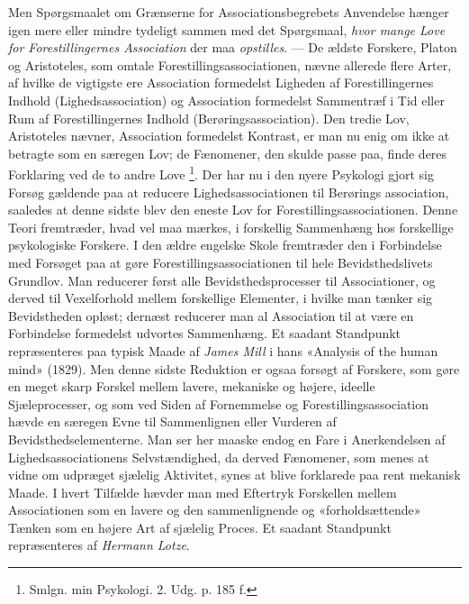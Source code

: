 \documentclass[12pt,a4paper,openany]{book}
\newcommand{\opage}[1]{\marginnote{\footnotesize\textit{[#1]}}}
\begin{document}
Men Spørgsmaalet om Grænserne for Associationsbegrebets Anvendelse hænger igen
mere eller mindre tydeligt sammen med det Spørgsmaal, \emph{hvor mange Love for
Forestillingernes Association} der maa \emph{opstilles}. --- De ældste
Forskere, Platon og Aristoteles, som omtale Forestillingsassociationen, nævne
allerede flere Arter, af hvilke de vigtigste ere Association formedelst
Ligheden af Forestillingernes Indhold (Lighedsassociation) og Association
formedelst Sammentræf i Tid eller Rum af Forestillingernes Indhold
(Berøringsassociation). Den tredie Lov, Aristoteles nævner, Association
formedelst Kontrast, er man nu enig om ikke at betragte som en særegen Lov; de
Fænomener, den skulde passe paa, finde deres Forklaring ved de to andre Love%
\footnote[1]{Smlgn. min Psykologi. 2. Udg. p. 185 f.}. Der har nu i den nyere
Psykologi gjort sig Forsøg gældende paa at reducere Lighedsassociationen til
Berørings%
\setcounter{footnote}{0}%
\opage{7}association, saaledes at denne sidste blev den eneste Lov for
Forestillingsassociationen. Denne Teori fremtræder, hvad vel maa mærkes, i
forskellig Sammenhæng hos forskellige psykologiske Forskere. I den ældre
engelske Skole fremtræder den i Forbindelse med Forsøget paa at gøre
Forestillingsassociationen til hele Bevidsthedslivets Grundlov. Man reducerer
først alle Bevidsthedsprocesser til Associationer, og derved til Vexelforhold
mellem forskellige Elementer, i hvilke man tænker sig Bevidstheden opløst;
dernæst reducerer man al Association til at være en Forbindelse formedelst
udvortes Sammenhæng. Et saadant Standpunkt repræsenteres paa typisk Maade af
\emph{James Mill} i hans «Analysis of the human mind» (1829). Men denne sidste
Reduktion er ogsaa forsøgt af Forskere, som gøre en meget skarp Forskel mellem
lavere, mekaniske og højere, ideelle Sjæleprocesser, og som ved Siden af
Fornemmelse og Forestillingsassociation hævde en særegen Evne til Sammenlignen
eller Vurderen af Bevidsthedselementerne. Man ser her maaske endog en Fare i
Anerkendelsen af Lighedsassociationens Selvstændighed, da derved Fænomener, som
menes at vidne om udpræget sjælelig Aktivitet, synes at blive forklarede paa
rent mekanisk Maade. I hvert Tilfælde hævder man med Eftertryk Forskellen
mellem Associationen som en lavere og den sammenlignende og «forholdsættende»
Tænken som en højere Art af sjælelig Proces. Et saadant Standpunkt
repræsenteres af \emph{Hermann Lotze}.
\end{document}
